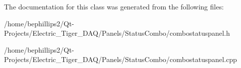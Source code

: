 The documentation for this class was generated from the following files\+:\begin{DoxyCompactItemize}
\item 
/home/bephillips2/\+Qt-\/\+Projects/\+Electric\+\_\+\+Tiger\+\_\+\+D\+A\+Q/\+Panels/\+Status\+Combo/combostatuspanel.\+h\item 
/home/bephillips2/\+Qt-\/\+Projects/\+Electric\+\_\+\+Tiger\+\_\+\+D\+A\+Q/\+Panels/\+Status\+Combo/combostatuspanel.\+cpp\end{DoxyCompactItemize}

